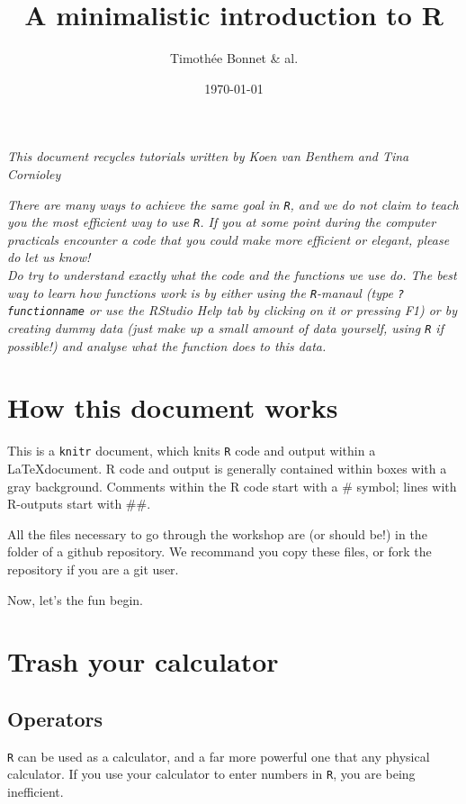 \documentclass[12pt,a4paper]{scrartcl}\usepackage[]{graphicx}\usepackage[]{color}
\title{A minimalistic introduction to R}
\date{\today}
\author{Timothée Bonnet \& al.}
\begin{document}
\maketitle

\textit{This document recycles tutorials written by Koen van Benthem and Tina Cornioley}

\tableofcontents



\vspace{2cm}
\begin{mdframed}
\textit{There are many ways to achieve the same goal in \texttt{R}, and we do not claim to teach you the most efficient way to use \texttt{R}. If you at some point during the computer practicals encounter a code that you could make more efficient or elegant, please do let us know! \\[1.5ex] 
Do try to understand exactly what the code and the functions we use do. The best way to learn how functions work is by either using the \texttt{R}-manaul (type \texttt{?functionname} or use the RStudio Help tab by clicking on it or pressing F1) or by creating dummy data (just make up a small amount of data yourself, using \texttt{R} if possible!) and analyse what the function does to this data.}
\end{mdframed}
\newpage

\section*{How this document works}
This is a \texttt{knitr} document, which knits \texttt{R} code and output within a \LaTeX document.
R code and output is generally contained within boxes with a gray background. Comments within the R code start with a \# symbol; lines with R-outputs start with \#\#.

All the files necessary to go through the workshop are (or should be!) in the folder of a github repository. We recommand you copy these files, or fork the repository if you are a git user.

Now, let's the fun begin.

\section{Trash your calculator}
\subsection{Operators}
\texttt{R} can be used as a calculator, and a far more powerful one that any physical calculator. If you use your calculator to enter numbers in \texttt{R}, you are being inefficient.
\end{document}
